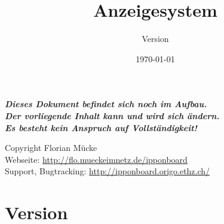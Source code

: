 ﻿\documentclass[11pt,numbers=noenddot]{scrreprt}
\title{{\IB} Anzeigesystem}
\subtitle{Version \IBVersion}
\date{\today}
\begin{document}
\maketitle

\thispagestyle{empty}

\vspace*{\fill}

{\centering\bfseries\itshape\LARGE
Dieses Dokument befindet sich noch im Aufbau.\\
Der vorliegende Inhalt kann und wird sich ändern.\\
Es besteht kein Anspruch auf Vollständigkeit! \par}

\vspace*{\fill}

\begin{center}
{%
Copyright  Florian Mücke \\
Webseite: \url{http://flo.mueckeimnetz.de/ipponboard} \\
Support, Bugtracking: \url{http://ipponboard.origo.ethz.ch/}}
\end{center}


\renewcommand\contentsname{Inhalt}
\tableofcontents

\chapter{Version}
\end{document}
